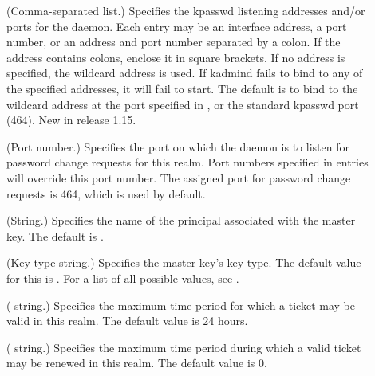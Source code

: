 \documentclass[letterpaper,10pt,english]{sphinxmanual}
\begin{document}
\begin{description}
\item[{}] \leavevmode
(Comma-separated list.)  Specifies the kpasswd listening addresses
and/or ports for the {\hyperref[\detokenize{admin/admin_commands/kadmind:kadmind-8}]{}} daemon.  Each entry may be
an interface address, a port number, or an address and port number
separated by a colon.  If the address contains colons, enclose it
in square brackets.  If no address is specified, the wildcard
address is used.  If kadmind fails to bind to any of the specified
addresses, it will fail to start.  The default is to bind to the
wildcard address at the port specified in , or the
standard kpasswd port (464).  New in release 1.15.

\item[{}] \leavevmode
(Port number.)  Specifies the port on which the {\hyperref[\detokenize{admin/admin_commands/kadmind:kadmind-8}]{}}
daemon is to listen for password change requests for this realm.
Port numbers specified in  entries will override
this port number.  The assigned port for password change requests
is 464, which is used by default.

\item[{}] \leavevmode
(String.)  Specifies the name of the principal associated with the
master key.  The default is .

\item[{}] \leavevmode
(Key type string.)  Specifies the master key’s key type.  The
default value for this is .  For a list of all possible
values, see {\hyperref[\detokenize{admin/conf_files/kdc_conf:encryption-types}]{}}.

\item[{}] \leavevmode
( string.)  Specifies the maximum time period for
which a ticket may be valid in this realm.  The default value is
24 hours.

\item[{}] \leavevmode
( string.)  Specifies the maximum time period
during which a valid ticket may be renewed in this realm.
The default value is 0.


\end{description}
\end{document}
